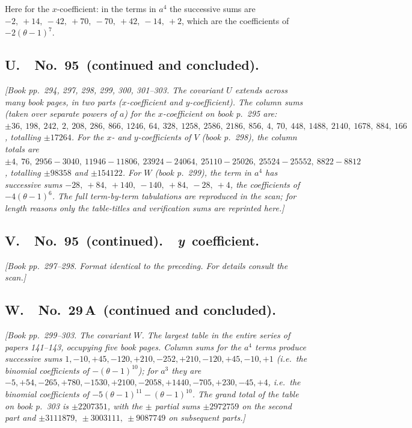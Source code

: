 \documentclass[11pt]{article}
\begin{document}
Here for the $x$-coefficient: in the terms in $a^4$ the successive sums are
$-2,\ +14,\ -42,\ +70,\ -70,\ +42,\ -14,\ +2$, which are the coefficients of $-2(\theta-1)^7$.

\bigskip

\subsection*{U.\ \ No.\ 95\ (continued and concluded).}

\textit{[Book pp.~294, 297, 298, 299, 300, 301--303. The covariant $U$ extends across many book pages, in two parts ($x$-coefficient and $y$-coefficient). The column sums (taken over separate powers of $a$) for the $x$-coefficient on book p.~295 are: $\pm 36,\ 198,\ 242,\ 2,\ 208,\ 286,\ 866,\ 1246,\ 64,\ 328,\ 1258,\ 2586,\ 2186,\ 856,\ 4,\ 70,\ 448,\ 1488,\ 2140,\ 1678,\ 884,\ 166$, totalling $\pm 17264$. For the $x$- and $y$-coefficients of $V$ (book p.~298), the column totals are $\pm 4,\ 76,\ 2956-3040,\ 11946-11806,\ 23924-24064,\ 25110-25026,\ 25524-25552,\ 8822-8812$, totalling $\pm 98358$ and $\pm 154122$. For $W$ (book p.~299), the term in $a^4$ has successive sums $-28,\ +84,\ +140,\ -140,\ +84,\ -28,\ +4$, the coefficients of $-4(\theta-1)^6$. The full term-by-term tabulations are reproduced in the scan; for length reasons only the table-titles and verification sums are reprinted here.]}

\bigskip

\subsection*{V.\ \ No.\ 95\ (continued).\ \ \textit{y}\ coefficient.}

\textit{[Book pp.~297--298. Format identical to the preceding. For details consult the scan.]}

\bigskip

\subsection*{W.\ \ No.\ 29\,A\ (continued and concluded).}

\textit{[Book pp.~299--303. The covariant $W$. The largest table in the entire series of papers 141--143, occupying five book pages. Column sums for the $a^4$ terms produce successive sums $1, -10, +45, -120, +210, -252, +210, -120, +45, -10, +1$ (i.e.\ the binomial coefficients of $-(\theta-1)^{10}$); for $a^3$ they are $-5, +54, -265, +780, -1530, +2100, -2058, +1440, -705, +230, -45, +4$, i.e.\ the binomial coefficients of $-5(\theta-1)^{11} - (\theta-1)^{10}$. The grand total of the table on book p.~303 is $\pm 2207351$, with the $\pm$ partial sums $\pm 2972759$ on the second part and $\pm 3111879,\ \pm 3003111,\ \pm 9087749$ on subsequent parts.]}
\end{document}
